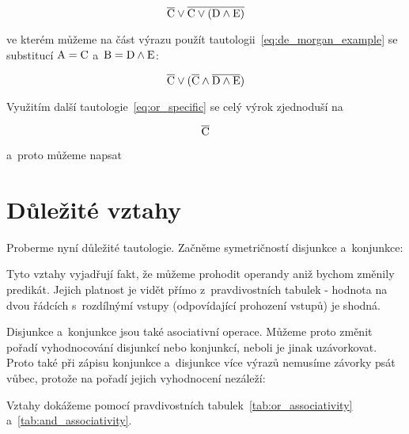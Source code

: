 \begin{equation}
\overline{\mathrm{C}} \lor \overline{\mathrm{C} \lor (\mathrm{D} \land \mathrm{E})}
\end{equation}

ve kterém můžeme na část výrazu použít tautologii~\eqref{eq:de_morgan_example} se substitucí \(\mathrm{A} = \mathrm{C}\) a~\(\mathrm{B} = \mathrm{D} \land \mathrm{E}\):

\begin{equation}
\overline{\mathrm{C}} \lor (\overline{\mathrm{C}} \land \overline{\mathrm{D} \land \mathrm{E}})
\end{equation}

Využitím další tautologie~\eqref{eq:or_specific} se celý výrok zjednoduší na

\begin{equation}
\overline{\mathrm{C}}
\end{equation}

a~proto můžeme napsat


\section{Důležité vztahy}

Proberme nyní důležité tautologie. Začněme symetričností disjunkce a~konjunkce:


Tyto vztahy vyjadřují fakt, že můžeme prohodit operandy aniž bychom změnily predikát. Jejich platnost je vidět přímo z~pravdivostních tabulek - hodnota na dvou řádcích s~rozdílnýmí vstupy (odpovídající prohození vstupů) je shodná.

Disjunkce a~konjunkce jsou také asociativní operace. Můžeme proto změnit pořadí vyhodnocování disjunkcí nebo konjunkcí, neboli je jinak uzávorkovat. Proto také při zápisu konjunkce a~disjunkce více výrazů nemusíme závorky psát vůbec, protože na pořadí jejich vyhodnocení nezáleží:


Vztahy dokážeme pomocí pravdivostních tabulek~\ref{tab:or_associativity} a~\ref{tab:and_associativity}.


